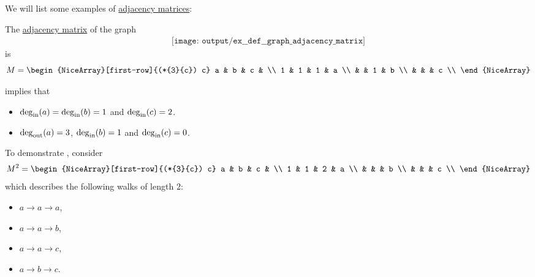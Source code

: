 \begin{example}\label{ex:def:graph_adjacency_matrix}
  We will list some examples of \hyperref[def:graph_adjacency_matrix]{adjacency matrices}:
  \begin{thmenum}
     The \hyperref[def:graph_adjacency_matrix]{adjacency matrix} of the graph
    \begin{equation}\label{eq:ex:def:graph_adjacency_matrix/triangle/graph}
      \begin{aligned}
        \texttt{[image: output/ex\_\_def\_\_graph\_adjacency\_matrix]}
      \end{aligned}
    \end{equation}
    is
    \begin{equation}\label{eq:ex:def:graph_adjacency_matrix/triangle/graph/matrix}
      M =
      \begin{NiceArray}[first-row]{(*{3}{c}) c}
        a & b & c &   \\
        1 & 1 & 1 & a \\
          &   & 1 & b \\
          &   &   & c \\
      \end{NiceArray}
    \end{equation}

     implies that
    \begin{itemize}
      \item \( \deg_{\op{in}}(a) = \deg_{\op{in}}(b) = 1 \) and \( \deg_{\op{in}}(c) = 2 \).
      \item \( \deg_{\op{out}}(a) = 3 \), \( \deg_{\op{in}}(b) = 1 \) and \( \deg_{\op{in}}(c) = 0 \).
    \end{itemize}

    To demonstrate , consider
    \begin{equation*}
      M^2 =
      \begin{NiceArray}[first-row]{(*{3}{c}) c}
        a & b & c &   \\
        1 & 1 & 2 & a \\
          &   &   & b \\
          &   &   & c \\
      \end{NiceArray}
    \end{equation*}
    which describes the following walks of length \( 2 \):
    \begin{itemize}
      \item \( a \to a \to a \),
      \item \( a \to a \to b \),
      \item \( a \to a \to c \),
      \item \( a \to b \to c \).
    \end{itemize}


\end{thmenum}
\end{example}
